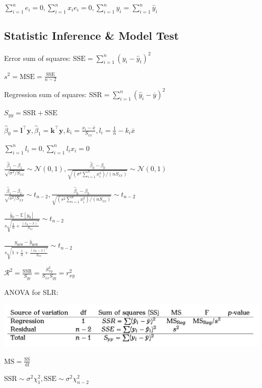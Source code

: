 \documentclass[9pt,landscape]{article}
\begin{document}
\begin{multicols}{3}
$\sum_{i=1}^{n}e_i=0, \sum_{i=1}^{n}x_ie_i=0, \sum_{i=1}^{n}y_i=\sum_{i=1}^{n}\hat{y}_i$

\subsection{Statistic Inference \& Model Test}

Error sum of squares: $\mathrm{SSE}=\sum_{i=1}^{n}\left(y_i-\hat{y}_i\right)^2$

$s^2=\mathrm{MSE}=\frac{\mathrm{SSE}}{n-2}$

Regression sum of squares: $\mathrm{SSR}=\sum_{i=1}^{n}\left(\hat{y}_i-\overline{y}\right)^2$

$S_{yy}=\mathrm{SSR} + \mathrm{SSE}$

$\hat{\beta}_0=\boldsymbol{l}^\top\boldsymbol{y}, \hat{\beta}_1=\boldsymbol{k}^\top \boldsymbol{y}, k_i=\frac{x_i-\overline{x}}{S_{xx}}, l_i=\frac{1}{n}-k_i\overline{x}$

$\sum_{i=1}^{n}l_i=0, \sum_{i=1}^{n}l_ix_i=0$

$\frac{\hat{\beta}_1-\beta_1}{\sqrt{\sigma^2/S_{xx}}}\sim\mathcal{N}(0, 1), \frac{\hat{\beta}_0-\beta_0}{\sqrt{\left(\sigma^2\sum_{i=1}^{n}x_i^2\right)/\left(nS_{xx}\right)}}\sim\mathcal{N}(0, 1)$

$\frac{\hat{\beta}_1-\beta_1}{\sqrt{s^2/S_{xx}}}\sim t_{n-2}, \frac{\hat{\beta}_0-\beta_0}{\sqrt{\left(s^2\sum_{i=1}^{n}x_i^2\right)/\left(nS_{xx}\right)}}\sim t_{n-2}$

$
\frac{\hat{y}_0-\mathbb{E}[y_0]}{s\sqrt{\frac{1}{n}+\frac{\left(x_0-\overline{x}\right)^2}{S_{xx}}}}\sim t_{n-2}
$

$
\frac{y_{\text{new}}-\hat{y}_{\text{new}}}{s\sqrt{1+\frac{1}{n}+\frac{\left(x_0-\overline{x}\right)^2}{S_{xx}}}}\sim t_{n-2}
$

$
\mathcal{R}^2=\frac{\mathrm{SSR}}{S_{yy}}=\frac{S_{xy}^2}{S_{xx}S_{yy}}=r^2_{xy}
$

ANOVA for SLR:

\includegraphics[width=\columnwidth]{imgs/ANOVA_for_SLR}

$\mathrm{MS}=\frac{\mathrm{SS}}{\mathrm{df}}$

$\mathrm{SSR}\sim \sigma^2\chi^2_1, \mathrm{SSE}\sim\sigma^2\chi^2_{n-2}$


\end{multicols}
\end{document}
